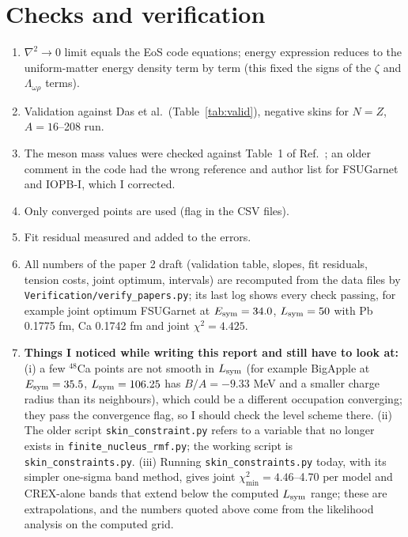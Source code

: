 \documentclass[11pt,a4paper]{article}
\newcommand{\Esym}{E_{\rm sym}}
\newcommand{\Lsym}{L_{\rm sym}}
\begin{document}
\section{Checks and verification}
\begin{enumerate}
\item $\nabla^2\to0$ limit equals the EoS code equations; energy expression reduces to the uniform-matter energy density term by term (this fixed the signs of the $\zeta$ and $\Lambda_{\omega\rho}$ terms).
\item Validation against Das et al.\ (Table~\ref{tab:valid}), negative skins for $N=Z$, $A=16$--208 run.
\item The meson mass values were checked against Table~1 of Ref.~\cite{Das2021}; an older comment in the code had the wrong reference and author list for FSUGarnet and IOPB-I, which I corrected.
\item Only converged points are used (flag in the CSV files).
\item Fit residual measured and added to the errors.
\item All numbers of the paper 2 draft (validation table, slopes, fit residuals, tension costs, joint optimum, intervals) are recomputed from the data files by \texttt{Verification/verify\_papers.py}; its last log shows every check passing, for example joint optimum FSUGarnet at $\Esym=34.0$, $\Lsym=50$ with Pb 0.1775 fm, Ca 0.1742 fm and joint $\chi^2=4.425$.
\item \textbf{Things I noticed while writing this report and still have to look at:} (i) a few $^{48}$Ca points are not smooth in $\Lsym$ (for example BigApple at $\Esym=35.5$, $\Lsym=106.25$ has $B/A=-9.33$ MeV and a smaller charge radius than its neighbours), which could be a different occupation converging; they pass the convergence flag, so I should check the level scheme there. (ii) The older script \texttt{skin\_constraint.py} refers to a variable that no longer exists in \texttt{finite\_nucleus\_rmf.py}; the working script is \texttt{skin\_constraints.py}. (iii) Running \texttt{skin\_constraints.py} today, with its simpler one-sigma band method, gives joint $\chi^2_{\min}=4.46$--4.70 per model and CREX-alone bands that extend below the computed $\Lsym$ range; these are extrapolations, and the numbers quoted above come from the likelihood analysis on the computed grid.
\end{enumerate}
\end{document}
